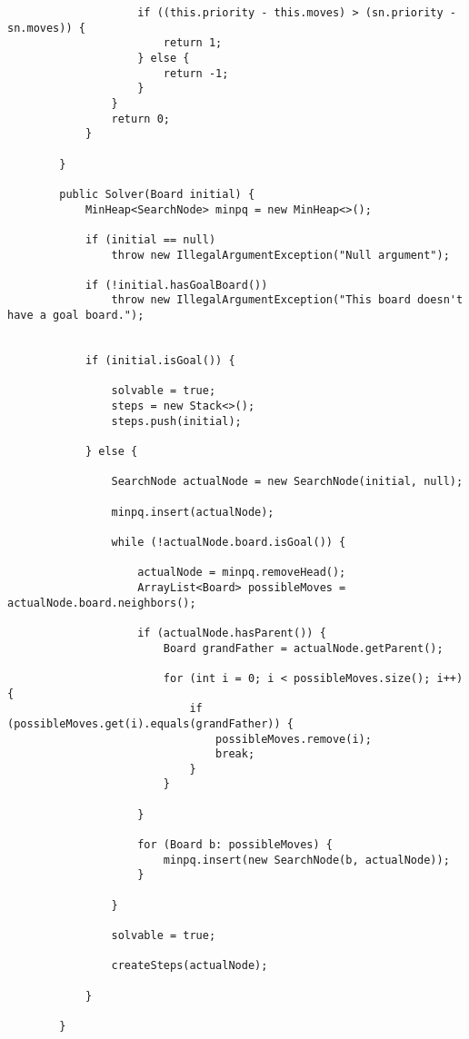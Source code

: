 \documentclass[paper=a4, fontsize=11pt]{scrartcl} %
\numberwithin{equation}{section} %
\numberwithin{figure}{section} %
\numberwithin{table}{section} %
\begin{document}
\begin{lstlisting}
                    if ((this.priority - this.moves) > (sn.priority - sn.moves)) {
                        return 1;
                    } else {
                        return -1;
                    }
                }
                return 0;
            }

        }

        public Solver(Board initial) {
            MinHeap<SearchNode> minpq = new MinHeap<>();

            if (initial == null)
                throw new IllegalArgumentException("Null argument");

            if (!initial.hasGoalBoard())
                throw new IllegalArgumentException("This board doesn't have a goal board.");


            if (initial.isGoal()) {

                solvable = true;
                steps = new Stack<>();
                steps.push(initial);

            } else {

                SearchNode actualNode = new SearchNode(initial, null);

                minpq.insert(actualNode);

                while (!actualNode.board.isGoal()) {

                    actualNode = minpq.removeHead();
                    ArrayList<Board> possibleMoves = actualNode.board.neighbors();

                    if (actualNode.hasParent()) {
                        Board grandFather = actualNode.getParent();

                        for (int i = 0; i < possibleMoves.size(); i++) {
                            if (possibleMoves.get(i).equals(grandFather)) {
                                possibleMoves.remove(i);
                                break;
                            }
                        }

                    }

                    for (Board b: possibleMoves) {
                        minpq.insert(new SearchNode(b, actualNode));
                    }

                }

                solvable = true;

                createSteps(actualNode);

            }

        }


\end{lstlisting}
\end{document}

